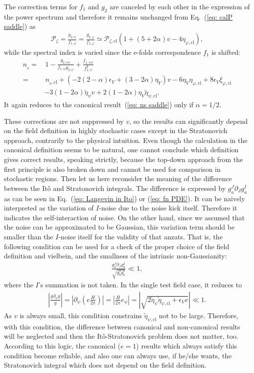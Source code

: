 \documentclass[aps, prd
, preprint
, nofootinbib 
, superscriptaddress
, longbibliography
]{revtex4-1}
\newcommand{\ns}{n_{{}_\mathrm{S}}}
\newcommand{\cl}{\text{cl}}
\newcommand{\calP}{\mathcal{P}}
\newcommand{\bae}[1]{\begin{align} #1 \end{align}}
\begin{document}
The correction terms for $f_1$ and $g_2$ are canceled by each other in the expression of the power spectrum and therefore it remains unchanged 
from Eq.~(\ref{eq: calP saddle}) as
\bae{
	\calP_\zeta=\frac{g_{2,\psi}}{f_{1,\psi}}=\frac{g_{2,\varphi}}{f_{1,\varphi}}\simeq\calP_{\zeta,\cl}\left(1+(5+2\alpha)v-4\eta_{\varphi,\cl}\right),
}
while the spectral index is varied since the e-folds correspondence $f_1$ is shifted:
\bae{
	\ns=&\,1-\frac{g_{2,\psi\psi}}{f_{1,\psi}g_{2,\psi}}+\frac{f_{1,\psi\psi}}{f_{1,\psi}^2} \nonumber \\
	=&\,n_{{}_\text{S},\cl}+\left(-2(2-\alpha)\epsilon_V+(3-2\alpha)\eta_V\right)v-6\eta_V\eta_{\varphi,\cl}+8\epsilon_V\xi_{\varphi,\cl} \nonumber \\
	&-3(1-2\alpha)\tilde{\eta}_{\psi}v+2(1-2\alpha)\eta_V\tilde{\eta}_{\psi,\cl}.
}
It again reduces to the canonical result~(\ref{eq: ns saddle}) only if $\alpha=1/2$.

These corrections are not suppressed by $v$, so the results can significantly depend on the field definition in highly stochastic cases 
except in the Stratonovich approach, contrarily to
the physical intuition. Even though the calculation in the canonical definition seems to be natural, one cannot conclude which definition gives correct results, 
speaking strictly, because the top-down approach from the first principle is also broken down and cannot be used for comparison in stochastic regions.
Then let us here reconsider the meaning of the difference between the It\^o and Stratonovich integrals.
The difference is expressed by $g^J_a\partial_Jg^I_a$ as can be seen in Eq.~(\ref{eq: Langevin in Ito}) or (\ref{eq: fn PDE}).
It can be naively interpreted as the variation of $I$-noise due to the noise kick itself. Therefore it indicates the self-interaction of noise.
On the other hand, since we assumed that the noise can be approximated to be Gaussian, this variation term should be smaller than the $I$-noise itself for the validity of that anzats.
That is, the following condition can be used for a check of the proper choice of the field definition and vielbein, and the smallness of the intrinsic non-Gaussianity:
\bae{
	\frac{g^J_a\partial_Jg^I_a}{\sqrt{g^I_bg^I_b}}\ll1,
}
where the $I$'s summation is not taken. In the single test field case, it reduces to
\bae{
	\left|\frac{g\partial_\psi g}{g}\right|=\left|\partial_\psi\left(e\frac{H}{2\pi}\right)\right|=\left|\frac{H}{2\pi}e_\psi\right|=\left|\sqrt{2\tilde{\eta}_\psi\tilde{\eta}_{\psi,\cl}+\epsilon_Vv}\right|\ll1.
}
As $v$ is always small, this condition constrains $\tilde{\eta}_{\psi,\cl}$ not to be large.
Therefore, with this condition, the difference between canonical and non-canonical results will be neglected and then the It\^o-Stratonovich problem does not matter, too.
According to this logic, the canonical ($e=1$) results which always satisfy this condition become reliable, and also one can always use, if he/she wants, 
the Stratonovich integral which does not depend on the field definition.
\end{document}

